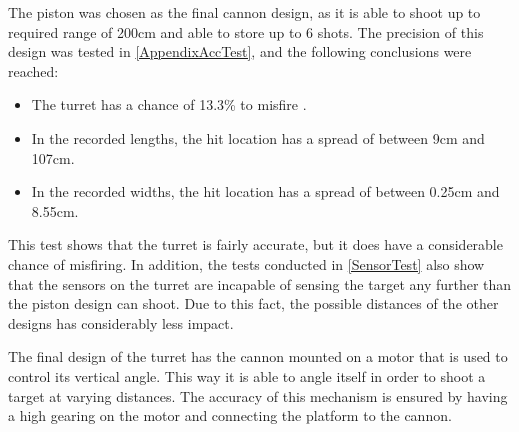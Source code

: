 The piston was chosen as the final cannon design, as it is able to shoot up to
required range of 200cm and able to store up to  6 shots. The precision of
this design was tested in \autoref{AppendixAccTest}, and the following conclusions
were reached:

\begin{itemize}
  \item The turret has a chance of 13.3\% to misfire .
  \item In the recorded lengths, the hit location has a spread of between 9cm
  and 107cm.
  \item In the recorded widths, the hit location has a spread of between 0.25cm
  and 8.55cm.
\end{itemize}

This test shows that the turret is fairly accurate, but it does have a
considerable chance of misfiring. In addition, the tests conducted in
\autoref{SensorTest} also show that the sensors on the turret are incapable
of sensing the target any further than the piston design can shoot. Due to this
fact, the possible distances of the other designs has considerably less
impact.\nl

The final design of the turret has the cannon mounted on a motor that is
used to control its vertical angle. This way it is able to angle itself in order
to shoot a target at varying distances. The accuracy of this mechanism is
ensured by having a high gearing on the motor and connecting the
platform to the cannon.



